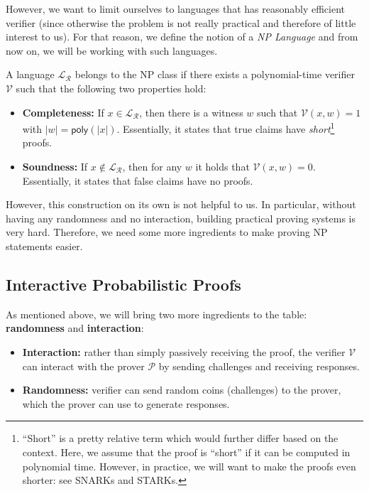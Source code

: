 \documentclass[../lecture-notes.tex]{subfiles}
\begin{document}
However, we want to limit ourselves to languages that has reasonably efficient verifier (since otherwise the problem is not really practical and therefore of little interest to us). For that reason, we define the notion of a \emph{NP Language} and from now on, we will be working with such languages.

\begin{definition}[NP Language]
    A language $\mathcal{L}_{\mathcal{R}}$ belongs to the NP class if there exists a polynomial-time verifier $\mathcal{V}$ such that the following two properties hold:
    \begin{itemize}
        \item \textbf{Completeness:} If $x \in \mathcal{L}_{\mathcal{R}}$, then there is a witness $w$ such that $\mathcal{V}(x, w) = 1$ with $|w| = \mathsf{poly}(|x|)$. Essentially, it states that true claims have \textit{short}\footnote{``Short'' is a pretty relative term which would further differ based on the context. Here, we assume that the proof is ``short'' if it can be computed in polynomial time. However, in practice, we will want to make the proofs even shorter: see SNARKs and STARKs.} proofs.
        \item \textbf{Soundness:} If $x \not\in \mathcal{L}_{\mathcal{R}}$, then for any $w$ it holds that $\mathcal{V}(x, w) = 0$. Essentially, it states that false claims have no proofs.
    \end{itemize}
\end{definition}

However, this construction on its own is not helpful to us. In particular, without having any randomness and no interaction, building practical proving systems is very hard. Therefore, we need some more ingredients to make proving NP statements easier.

\subsection{Interactive Probabilistic Proofs}

As mentioned above, we will bring two more ingredients to the table: \textbf{randomness} and \textbf{interaction}:
\begin{itemize}
    \item \textbf{Interaction:} rather than simply passively receiving the proof, the verifier $\mathcal{V}$ can interact with the prover $\mathcal{P}$ by sending challenges and receiving responses.
    \item \textbf{Randomness:} verifier can send random coins (challenges) to the prover, which the prover can use to generate responses.
\end{itemize}
\end{document}
